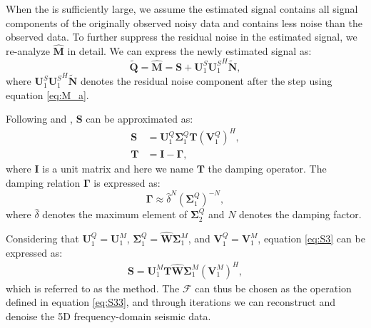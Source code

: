 When the  is sufficiently large, we assume the estimated signal contains all signal components of the originally observed noisy data and contains less noise than the observed data. To further suppress the residual noise in the estimated signal, we re-analyze $\hat{\mathbf{M}}$ in detail. We can express the newly estimated signal as:
\begin{equation}
\label{eq:M_a2}
\tilde{\mathbf{Q}}=\hat{\mathbf{M}}=\mathbf{S}+\mathbf{U}_1^{S}{\mathbf{U}_1^{S}}^H\tilde{\mathbf{N}},
\end{equation}
where $\mathbf{U}_1^{S}{\mathbf{U}_1^{S}}^H\tilde{\mathbf{N}}$ denotes the residual noise component after the step using equation \ref{eq:M_a}.

Following \cite{yangkang2016irr5d} and \cite{weilin2016}, $\mathbf{S}$ can be approximated as:
\begin{align}
\label{eq:S3}
\mathbf{S} &= \mathbf{U}_1^{Q}\boldsymbol{\Sigma}_1^{Q}\mathbf{T}\left(\mathbf{V}_1^{Q}\right)^H,\\
\label{eq:T}
\mathbf{T} &= \mathbf{I}-\boldsymbol{\Gamma},
\end{align}
where $\mathbf{I}$ is a unit matrix and here we name $\mathbf{T}$ the damping operator. The damping relation $\boldsymbol{\Gamma}$ is expressed as:
\begin{equation}
\label{eq:Gamma}
\boldsymbol{\Gamma} \approx \hat{\delta}^N\left(\boldsymbol{\Sigma}_1^{Q}\right)^{-N},
\end{equation}
where $\hat{\delta}$ denotes the maximum element of $\boldsymbol{\Sigma}_2^{Q}$ and $N$ denotes the damping factor. 

Considering that $\mathbf{U}_1^{Q} = \mathbf{U}_1^{M}$, $\boldsymbol{\Sigma}_1^{Q}= \hat{\mathbf{W}}\boldsymbol{\Sigma}_1^{M}$, and $\mathbf{V}_1^{Q} = \mathbf{V}_1^{M}$,  equation \ref{eq:S3} can be expressed as:
\begin{align}
\label{eq:S33}
\mathbf{S} = \mathbf{U}_1^{M} \mathbf{T} \hat{\mathbf{W}}\boldsymbol{\Sigma}_1^{M} \left(\mathbf{V}_1^{M}\right)^H,
\end{align}
which is referred to as the  method. The $\mathcal{F}$ can thus be chosen as the operation defined in equation \ref{eq:S33}, and through iterations we can reconstruct and denoise the 5D frequency-domain seismic data. 


